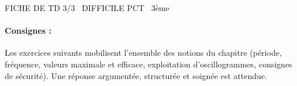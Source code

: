 \documentclass[11pt]{article}
\begin{document}
\begin{tcolorbox}[enhanced,colback=popink,colframe=popink,arc=10pt,boxrule=0pt,left=12pt,right=12pt,top=9pt,bottom=9pt]
{\color{white}\popxbold\small FICHE DE TD 3/3 \textbullet\ DIFFICILE \hfill PCT \textbullet\ 3ème\par}
\end{tcolorbox}
\vspace{4pt}
\paragraph{Consignes :} Les exercices suivants mobilisent l'ensemble des notions du chapitre (période, fréquence, valeurs maximale et efficace, exploitation d'oscillogrammes, consignes de sécurité). Une réponse argumentée, structurée et soignée est attendue.
\end{document}

